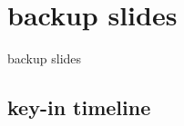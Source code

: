 \date{}
\title{}
\date{}

\begin{frame}
    \titlepage
\end{frame}



\section{backup slides}
\begin{frame}{backup slides}
\end{frame}

\subsection{key-in timeline}


